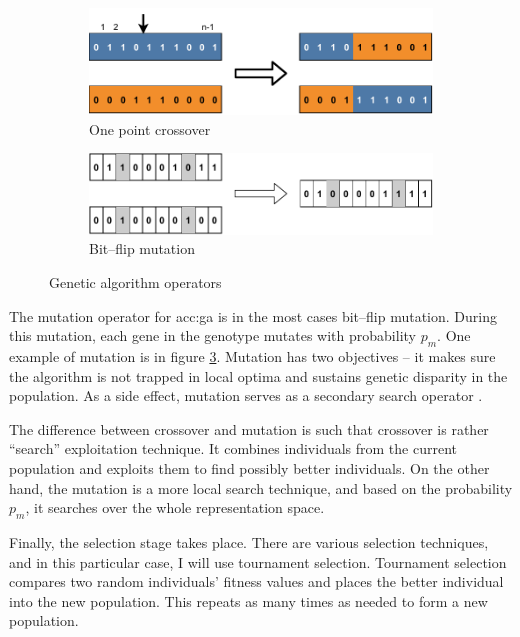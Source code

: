 \begin{figure}
    \begin{subfigure}[b]{0.4\textwidth}
        \includegraphics[width=\textwidth]{img/master_onepointcrossover.pdf}
        \caption{One point crossover}
        \label{fig:gaonepointcrossover}
    \end{subfigure}
    \hfill
    \begin{subfigure}[b]{0.4\textwidth}
        \includegraphics[width=\textwidth]{img/master_bitflipmutation.pdf}
        \caption{Bit--flip mutation}
        \label{fig:bitflipmutation}
    \end{subfigure}
    \caption{Genetic algorithm operators}
\end{figure}

The mutation operator for \acrshort{acc:ga} is in the most cases bit--flip mutation. During this mutation, each gene in the genotype mutates with probability $p_m$. One example of mutation is in figure \ref{fig:bitflipmutation}. Mutation has two objectives -- it makes sure the algorithm is not trapped in local optima and sustains genetic disparity in the population. As a side effect, mutation serves as a secondary search operator \citep{IntroToGA}.

The difference between crossover and mutation is such that crossover is rather \enquote{search} exploitation technique. It combines individuals from the current population and exploits them to find possibly better individuals. On the other hand, the mutation is a more local search technique, and based on the probability $p_m$, it searches over the whole representation space.

Finally, the selection stage takes place. There are various selection techniques, and in this particular case, I will use tournament selection. Tournament selection compares two random individuals' fitness values and places the better individual into the new population. This repeats as many times as needed to form a new population.

